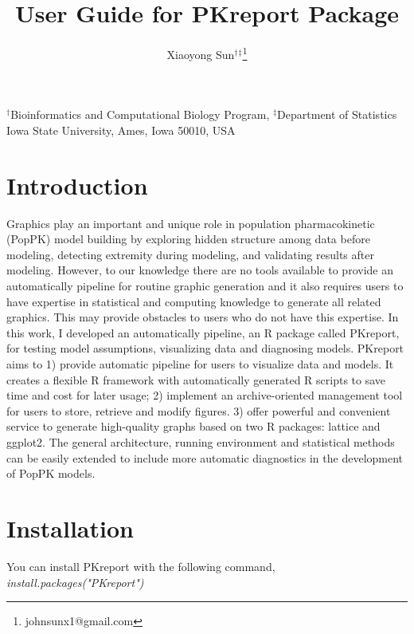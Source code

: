 \documentclass[a4paper]{article}
\author{Xiaoyong Sun$^\dagger$$^\ddagger$\footnote{johnsunx1@gmail.com}}
\begin{document}

\title{User Guide for PKreport Package}
\maketitle
\begin{center}$^\dagger$Bioinformatics and Computational Biology Program, $^\ddagger$Department of Statistics \\ Iowa State University, Ames, Iowa 50010, USA
\end{center}

\tableofcontents

\section{Introduction}

Graphics play an important and unique role in population pharmacokinetic (PopPK) model building by exploring hidden structure among data before modeling, detecting extremity during modeling, and validating results after modeling. However, to our knowledge there are no tools available to provide an automatically pipeline for routine graphic generation and it also requires users to have expertise in statistical and computing knowledge to generate all related graphics. This may provide obstacles to users who do not have this expertise. In this work, I developed an automatically pipeline, an R package called PKreport, for testing model assumptions, visualizing data and diagnosing models. PKreport aims to 1) provide automatic pipeline for users to visualize data and models. It creates a flexible R framework with automatically generated R scripts to save time and cost for later usage; 2) implement an archive-oriented management tool for users to store, retrieve and modify figures. 3) offer powerful and convenient service to generate high-quality graphs based on two R packages: lattice and ggplot2. The general architecture, running environment and statistical methods can be easily extended to include more automatic diagnostics in the development of PopPK models.

\section{Installation}
You can install PKreport with the following command,
\newline \newline
\textit{install.packages("PKreport")}
\end{document}
